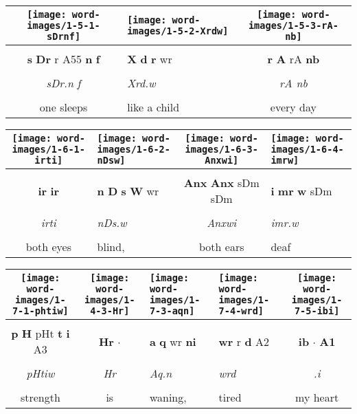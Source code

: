 \vspace*{\fill}

\pagebreak


\vspace*{\fill}

\begin{tabularx}{\linewidth}{cYc}
	\texttt{[image: word-images/1-5-1-sDrnf]} &
	\texttt{[image: word-images/1-5-2-Xrdw]} &
	\texttt{[image: word-images/1-5-3-rA-nb]} \\
	\hline \\ 
	\textbf{s} \textbf{Dr} r A55 \textbf{n} \textbf{f} &
	\textbf{X} \textbf{d} \textbf{r} wr &
	\textbf{r} \textbf{A} rA \textbf{nb} \\
	\hline \\ 
	\textit{sDr.n f} & \textit{Xrd}\textit{.w} & \textit{rA nb} \\
	\hline \\ 
	one sleeps & like a child & every day
\end{tabularx}

\vspace{7.5mm}

\begin{tabularx}{\linewidth}{cYcY}
	\texttt{[image: word-images/1-6-1-irti]} &
	\texttt{[image: word-images/1-6-2-nDsw]} &
	\texttt{[image: word-images/1-6-3-Anxwi]} &
	\texttt{[image: word-images/1-6-4-imrw]} \\
	\hline \\ 
	\textbf{ir} \textbf{ir} &
	\textbf{n} \textbf{D} \textbf{s} \textbf{W} wr &
	\textbf{Anx} \textbf{Anx} sDm sDm &
	\textbf{i} \textbf{mr} \textbf{w} sDm \\
	\hline \\ 
	\textit{irti} & \textit{nDs.w} & \textit{Anxwi} & \textit{imr.w} \\
	\hline \\ 
	both eyes & blind, & both ears & deaf
\end{tabularx}

\vspace{7.5mm}

\begin{tabularx}{\linewidth}{ccYYc}
	\texttt{[image: word-images/1-7-1-phtiw]} &
	\texttt{[image: word-images/1-4-3-Hr]} &
	\texttt{[image: word-images/1-7-3-aqn]} &
	\texttt{[image: word-images/1-7-4-wrd]} &
	\texttt{[image: word-images/1-7-5-ibi]} \\
	\hline \\ 
	\textbf{p} \textbf{H} pHt \textbf{t} \textbf{i} A3 &
	\textbf{Hr} $\cdot$ &
	\textbf{a} \textbf{q} wr \textbf{ni} &
	\textbf{wr} r \textbf{d} A2 &
	\textbf{ib} $\cdot$ \textbf{A1} \\
	\hline \\ 
	\textit{pHtiw} & \textit{Hr} & \textit{Aq.n} & \textit{wrd} & \textit{.i} \\
	\hline \\ 
	strength & is & waning, & tired & my heart
\end{tabularx}

